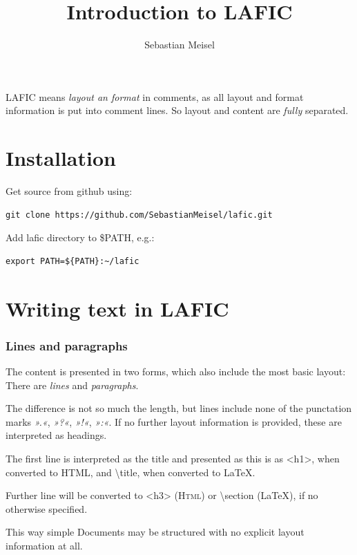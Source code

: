 \documentclass{article}
\title{Introduction to LAFIC}
\author{Sebastian Meisel}
\begin{document}
\maketitle


LAFIC means \emph{layout an format} in comments, as all layout and
format information is put into comment lines. So layout and
content are \emph{fully} separated.

\part{Installation}

Get source from github using:

\begin{verbatim}
git clone https://github.com/SebastianMeisel/lafic.git

\end{verbatim}

Add lafic directory to \$PATH, e.g.:

\begin{verbatim}
export PATH=${PATH}:~/lafic

\end{verbatim}

\part{Writing text in LAFIC}

\section{Lines and paragraphs}

The content is presented in two forms, which also include
the most basic layout: There are \emph{lines} and \emph{paragraphs}.

The difference is not so much the length, but lines include
none of the punctation marks \emph{».«}, \emph{»?«}, \emph{»!«}, \emph{»:«}. If no
further layout information is provided, these are
interpreted as headings.

The first line is interpreted as the title and presented as
this is as <h1>, when converted to HTML, and \textbackslash title, when 
converted to LaTeX.

Further line will be converted to <h3> (\textsc{Html}) or \textbackslash section
(LaTeX), if no otherwise specified.

This way simple Documents may be structured with no explicit
layout information at all.
\end{document}
